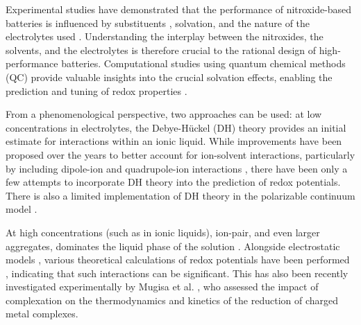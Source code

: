 \documentclass[review,preprint]{elsarticle}
\begin{document}
Experimental studies have demonstrated that the performance of nitroxide-based batteries is influenced by substituents \cite{sugaCathodeAnodeActivePoly2007}, solvation, and the nature of the electrolytes used \cite{armandIonicliquidMaterialsElectrochemical2009,strehmelRadicalsIonicLiquids2012,wylieIncreasedStabilityNitroxide2019b}. Understanding the interplay between the nitroxides, the solvents, and the electrolytes is therefore crucial to the rational design of high-performance batteries. Computational studies using quantum chemical methods (QC) provide valuable insights into the crucial solvation effects, enabling the prediction and tuning of redox properties \cite{madkourComputationalMonteCarlo2018,maftoon-azadElectrochemicalStabilityWindows2021,ritaccaExperimentalTheoreticalStudy2022,esmaeilbeigHydrolysisIronIons2022,jyothirmaiChangesStructureStability2022}.

From a phenomenological perspective, two approaches can be used: at low concentrations in electrolytes, the Debye-Hückel (DH) theory \cite{kontogeorgisDebyeHuckelTheoryIts2018,silvaDerivationsDebyeHuckel2022,silvaImprovingBornEquation2024} provides an initial estimate for interactions within an ionic liquid. While improvements have been proposed over the years to better account for ion-solvent interactions, particularly by including dipole-ion \cite{silvaImprovingBornEquation2024} and quadrupole-ion interactions \cite{slavchovQuadrupoleTermsMaxwell2014,slavchovQuadrupoleTermsMaxwell2014a,coxQuadrupolemediatedDielectricResponse2021}, there have been only a few attempts \cite{matsuiDensityFunctionalTheory2013,xiaoReorganizationEnergyElectron2013,xiaoMolecularDebyeHuckelApproach2014} to incorporate DH theory into the prediction of redox potentials. There is also a limited implementation of DH theory in the polarizable continuum model \cite{cossiInitioStudyIonic1998}. 

At high concentrations (such as in ionic liquids), ion-pair, and even larger aggregates, dominates the liquid phase of the solution \cite{marcusIonPairing2006,katsutaIonPairFormation2008,chabanAcetonitrileBoostsConductivity2012,rajputCouplingStabilityIon2015,ponnuchamySolventSaltEffect2018}. Alongside electrostatic models \cite{krishtalikElectrostaticIonSolvent1991,lundDielectricInterpretationSpecificity2010}, various theoretical calculations of redox potentials have been performed \cite{mehtaTheoreticalInvestigationRedox2007,quAccurateModelingEffect2016,taherkhaniInvestigationIonPairs2022}, indicating that such interactions can be significant. This has also been recently investigated experimentally by Mugisa et al. \cite{mugisaEffectIonparingKinetics2024}, who assessed the impact of complexation on the thermodynamics and kinetics of  the reduction  of charged metal complexes.
\end{document}
